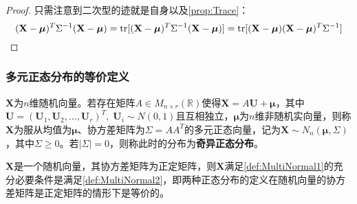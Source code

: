 \begin{proof}
	只需注意到二次型的迹就是自身以及\cref{prop:Trace}：
	\begin{equation*}
		(\mathbf{X}-\boldsymbol{\mu})^T\Sigma^{-1}(\mathbf{X}-\boldsymbol{\mu})=\operatorname{tr}[(\mathbf{X}-\boldsymbol{\mu})^T\Sigma^{-1}(\mathbf{X}-\boldsymbol{\mu})]=\operatorname{tr}[(\mathbf{X}-\boldsymbol{\mu})(\mathbf{X}-\boldsymbol{\mu})^T\Sigma^{-1}]\qedhere
	\end{equation*}
\end{proof}
\subsubsection{多元正态分布的等价定义}
\begin{definition}\label{def:MultiNormal2}
	$\mathbf{X}$为$n$维随机向量。若存在矩阵$A\in M_{n\times r}(\mathbb{R})$使得$\mathbf{X}=A\mathbf{U}+\boldsymbol{\mu}$，其中$\mathbf{U}=(\mathbf{U}_1,\mathbf{U}_2,\dots,\mathbf{U}_r)^T,\;\mathbf{U}_i\sim N(0,1)$且互相独立，$\boldsymbol{\mu}$为$n$维非随机实向量，则称$\mathbf{X}$为服从均值为$\boldsymbol{\mu}$、协方差矩阵为$\Sigma=AA^T$的多元正态向量，记为$\mathbf{X}\sim N_n(\boldsymbol{\mu},\Sigma)$，其中$\Sigma\geqslant0$。若$|\Sigma|=0$，则称此时的分布为\textbf{奇异正态分布}。
\end{definition}
\begin{theorem}
	$\mathbf{X}$是一个随机向量，其协方差矩阵为正定矩阵，则$\mathbf{X}$满足\cref{def:MultiNormal1}的充分必要条件是满足\cref{def:MultiNormal2}，即两种正态分布的定义在随机向量的协方差矩阵是正定矩阵的情形下是等价的。
\end{theorem}

